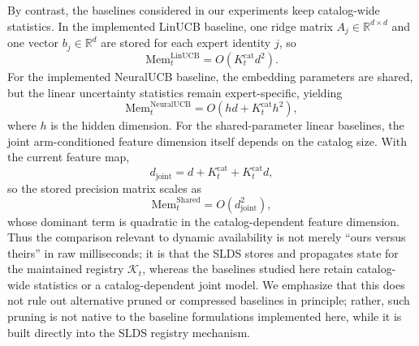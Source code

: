 By contrast, the baselines considered in our experiments keep catalog-wide statistics. In the implemented LinUCB baseline, one ridge matrix \(A_j \in \mathbb R^{d \times d}\) and one vector \(b_j \in \mathbb R^d\) are stored for each expert identity \(j\), so
\begin{equation}
\mathrm{Mem}_t^{\mathrm{LinUCB}}
=
O\!\left(
K_t^{\mathrm{cat}} d^2
\right).
\end{equation}
For the implemented NeuralUCB baseline, the embedding parameters are shared, but the linear uncertainty statistics remain expert-specific, yielding
\begin{equation}
\mathrm{Mem}_t^{\mathrm{NeuralUCB}}
=
O\!\left(
hd + K_t^{\mathrm{cat}} h^2
\right),
\end{equation}
where \(h\) is the hidden dimension. For the shared-parameter linear baselines, the joint arm-conditioned feature dimension itself depends on the catalog size. With the current feature map,
\begin{equation}
d_{\mathrm{joint}}
=
d + K_t^{\mathrm{cat}} + K_t^{\mathrm{cat}} d,
\end{equation}
so the stored precision matrix scales as
\begin{equation}
\mathrm{Mem}_t^{\mathrm{Shared}}
=
O\!\left(
d_{\mathrm{joint}}^2
\right),
\end{equation}
whose dominant term is quadratic in the catalog-dependent feature dimension. Thus the comparison relevant to dynamic availability is not merely ``ours versus theirs'' in raw milliseconds; it is that the SLDS stores and propagates state for the maintained registry \(\mathcal K_t\), whereas the baselines studied here retain catalog-wide statistics or a catalog-dependent joint model. We emphasize that this does not rule out alternative pruned or compressed baselines in principle; rather, such pruning is not native to the baseline formulations implemented here, while it is built directly into the SLDS registry mechanism.

